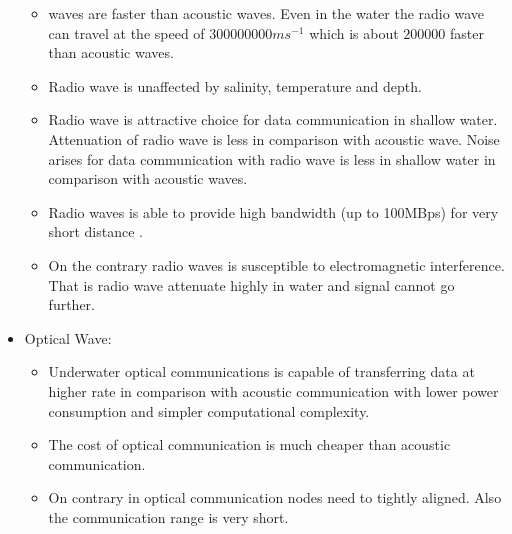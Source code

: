 \documentclass[11pt]{article}
\begin{document}
\begin{itemize}
\begin{itemize}
\item waves are faster than acoustic waves. Even in the water the radio wave can travel at the speed of $300000000 ms^{-1}$ which is about $200000$ faster than acoustic waves. 
\item Radio wave is unaffected by salinity, temperature and depth.
\item Radio wave is attractive choice for data communication in shallow water. Attenuation of radio wave is less in comparison with acoustic wave. Noise arises for data communication with radio wave is less in shallow water in comparison with acoustic waves.
\item Radio waves is able to provide high bandwidth (up to 100MBps) for very short distance \cite{che2010re}.
\item On the contrary radio waves is susceptible to electromagnetic interference. That is radio wave attenuate highly in water and signal cannot go further.
\end{itemize}
\item {Optical Wave:} 
\begin{itemize}
\item Underwater optical communications is capable of transferring data at higher rate in comparison with acoustic communication with lower power consumption and simpler computational complexity.
\item The cost of optical communication is much cheaper than acoustic communication.
\item On contrary in optical communication nodes need to tightly aligned. Also the communication range is very short.
\end{itemize}
\end{itemize} 
\end{document}
